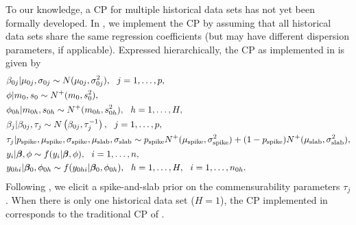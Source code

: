 To our knowledge, a CP for multiple historical data sets has not yet been formally developed. In , we implement the CP by assuming that all historical data sets share the same regression coefficients (but may have different dispersion parameters, if applicable).
Expressed hierarchically, the CP as implemented in  is given by
\begin{align}
   &\beta_{0j} | \mu_{0j}, \sigma_{0j} \sim N(\mu_{0j}, \sigma_{0j}^2), \ \ j = 1, \ldots, p
   , \notag \\
   &\phi | m_0, s_0 \sim N^+(m_0, s_0^2)
   ,\notag \\
   &\phi_{0h} | m_{0h}, s_{0h} \sim N^+(m_{0h}, s_{0h}^2), \ \ h = 1, \ldots, H 
   ,\notag \\
   &\beta_j | \beta_{0j}, \tau_j \sim N\left( \beta_{0j}, \tau_j^{-1} \right),
        \ \ j = 1, \ldots, p
    ,\notag \\
    &\tau_j | p_{\text{spike}}, \mu_{\text{spike}}, \sigma_{\text{spike}}, \mu_{\text{slab}}, \sigma_{\text{slab}} \sim 
    p_{\text{spike}} N^+(\mu_\text{spike}, \sigma_{\text{spike}}^2)
    + (1 - p_{\text{spike}}) N^+(\mu_{\text{slab}}, \sigma_{\text{slab}}^2)
    , \notag \\
    &y_i    | \bm{\beta}, \phi \sim f(y_i | \bm{\beta}, \phi), \ \  i = 1, \ldots, n
    , \notag \\
    &y_{0hi} | \bm{\beta}_0, \phi_{0h} \sim f(y_{0hi} | \bm{\beta}_0, \phi_{0h}), \ \ h = 1, \ldots, H, \ \  i = 1, \ldots, n_{0h}.
    \label{eq:comm_hm}
\end{align}
Following \citet{hobbs2012commensurate}, we elicit a spike-and-slab prior on the commensurability parameters $\tau_j$.
When there is only one historical data set ($H = 1$), the CP implemented in  corresponds to the traditional CP of \citet{hobbs2012commensurate}. 

